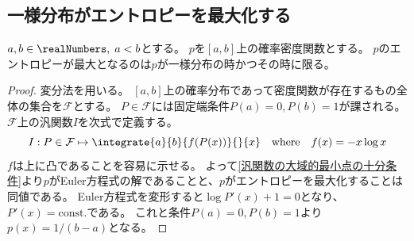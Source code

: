         \subsection{一様分布がエントロピーを最大化する}
            \begin{shadebox}
                $a,b\in\realNumbers,\;a<b$とする。
                $p$を$[a,b]$上の確率密度関数とする。
                $p$のエントロピーが最大となるのは$p$が一様分布の時かつその時に限る。
            \end{shadebox}
            \begin{proof}
                \quad\par
                変分法を用いる。
                $[a,b]$上の確率分布であって密度関数が存在するもの全体の集合を$\mathcal{F}$とする。
                $P\in\mathcal{F}$には固定端条件$P(a)=0,P(b)=1$が課される。
                $\mathcal{F}$上の汎関数$I$を次式で定義する。
                \[ I: P\in\mathcal{F} \mapsto \integrate{a}{b}{f(P(x))}{}{x} \quad \text{where} \quad f(x) = -x\log x \]
                $f$は上に凸であることを容易に示せる。
                よって\ref{汎関数の大域的最小点の十分条件}より$p$がEuler方程式の解であることと、$p$がエントロピーを最大化することは同値である。
                Euler方程式を変形すると$\log P'(x) + 1 = 0$となり、$P'(x) = \mathrm{const.}$である。
                これと条件$P(a)=0, P(b)=1$より$p(x) = 1/(b-a)$となる。
            \end{proof}
